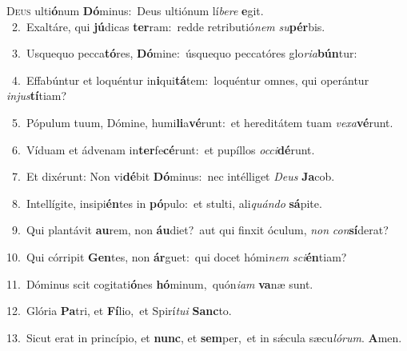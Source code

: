 \lettrine{\initial\textcolor{\initialcolor}{D}}{eus} ulti\-\textbf{ó}\-num \textbf{Dó}\-minus:~\star Deus ultiónum lí\-\textit{be}\-\textit{re} \textbf{e}\-git.\\
{\numbfont\textcolor{\numbcolor}{~2.}}~Exaltáre, qui \textbf{jú}\-dicas \textbf{ter}\-ram:~\star redde retributió\textit{nem} \textit{su}\-\textbf{pér}bis.\par
{\numbfont\textcolor{\numbcolor}{~3.}}~Usquequo pecca\-\textbf{tó}\-res, \textbf{Dó}\-mine:~\star úsquequo peccatóres glo\-\textit{ri}\-\textit{a}\textbf{bún}tur:\par
{\numbfont\textcolor{\numbcolor}{~4.}}~Effabúntur et loquéntur in\-\textbf{i}\-qui\-\textbf{tá}\-tem:~\star loquéntur omnes, qui operántur \textit{in}\-\textit{jus}\textbf{tí}tiam?\par
{\numbfont\textcolor{\numbcolor}{~5.}}~Pópulum tuum, Dómine, humi\-\textbf{li}\-a\-\textbf{vé}\-runt:~\star et hereditátem tuam \textit{ve}\-\textit{xa}\textbf{vé}runt.\par
{\numbfont\textcolor{\numbcolor}{~6.}}~Víduam et ádvenam in\-\textbf{ter}\-fe\-\textbf{cé}\-runt:~\star et pupíllos \textit{oc}\-\textit{ci}\textbf{dé}runt.\par
{\numbfont\textcolor{\numbcolor}{~7.}}~Et dixérunt: Non vi\-\textbf{dé}\-bit \textbf{Dó}\-minus:~\star nec intélliget \textit{De}\-\textit{us} \textbf{Ja}\-cob.\par
{\numbfont\textcolor{\numbcolor}{~8.}}~Intellígite, insipi\-\textbf{én}\-tes in \textbf{pó}\-pulo:~\star et stulti, ali\-\textit{quán}\-\textit{do} \textbf{sá}\-pite.\par
{\numbfont\textcolor{\numbcolor}{~9.}}~Qui plantávit \textbf{au}\-rem, non \textbf{áu}\-diet?~\star aut qui finxit óculum, \textit{non} \textit{con}\-\textbf{sí}derat?\par
{\numbfont\textcolor{\numbcolor}{10.}}~Qui córripit \textbf{Gen}\-tes, non \textbf{ár}\-guet:~\star qui docet hómi\textit{nem} \textit{sci}\-\textbf{én}tiam?\par
{\numbfont\textcolor{\numbcolor}{11.}}~Dóminus scit cogitati\-\textbf{ó}\-nes \textbf{hó}\-minum,~\star quón\-\textit{i}\-\textit{am} \textbf{va}\-næ sunt.\par
{\numbfont\textcolor{\numbcolor}{12.}}~Glória \textbf{Pa}\-tri, et \textbf{Fí}\-lio,~\star et Spirí\-\textit{tu}\-\textit{i} \textbf{Sanc}\-to.\par
{\numbfont\textcolor{\numbcolor}{13.}}~Sicut erat in princípio, et \textbf{nunc}\-, et \textbf{sem}\-per,~\star et in sǽcula sæcu\-\textit{ló}\-\textit{rum}. \textbf{A}\-men.\par
